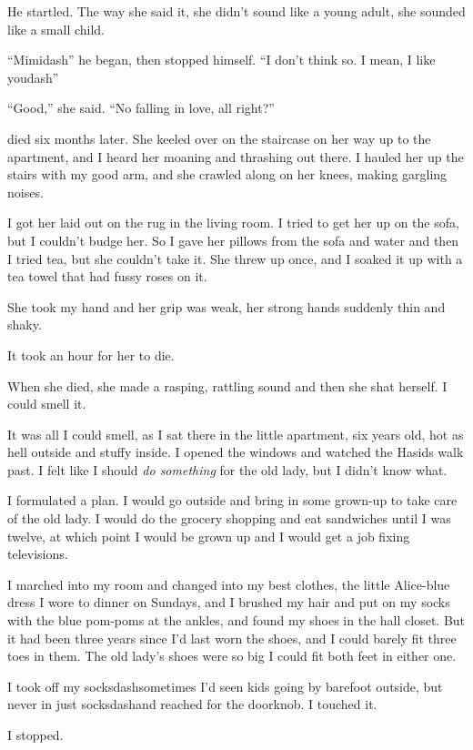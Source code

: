 He startled.  The way she said it, she didn't sound like a young
adult, she sounded like a small child.

``Mimidash{}'' he began, then stopped himself.  ``I don't think so.  I
mean, I like youdash{}''

``Good,'' she said.  ``No falling in love, all right?''

 died six months later.  She keeled over on the staircase on her
way up to the apartment, and I heard her moaning and thrashing out
there.  I hauled her up the stairs with my good arm, and she crawled
along on her knees, making gargling noises.

I got her laid out on the rug in the living room.  I tried to get her
up on the sofa, but I couldn't budge her.  So I gave her pillows from
the sofa and water and then I tried tea, but she couldn't take it. 
She threw up once, and I soaked it up with a tea towel that had fussy
roses on it.

She took my hand and her grip was weak, her strong hands suddenly thin
and shaky.

It took an hour for her to die.

When she died, she made a rasping, rattling sound and then she shat
herself.  I could smell it.

It was all I could smell, as I sat there in the little apartment, six
years old, hot as hell outside and stuffy inside.  I opened the
windows and watched the Hasids walk past.  I felt like I should
\textit{do something} for the old lady, but I didn't know what.

I formulated a plan.  I would go outside and bring in some grown-up to
take care of the old lady.  I would do the grocery shopping and eat
sandwiches until I was twelve, at which point I would be grown up and
I would get a job fixing televisions.

I marched into my room and changed into my best clothes, the little
Alice-blue dress I wore to dinner on Sundays, and I brushed my hair
and put on my socks with the blue pom-poms at the ankles, and found my
shoes in the hall closet.  But it had been three years since I'd last
worn the shoes, and I could barely fit three toes in them.  The old
lady's shoes were so big I could fit both feet in either one.

I took off my socksdash{}sometimes I'd seen kids going by barefoot
outside, but never in just socksdash{}and reached for the doorknob.  I
touched it.

I stopped.

